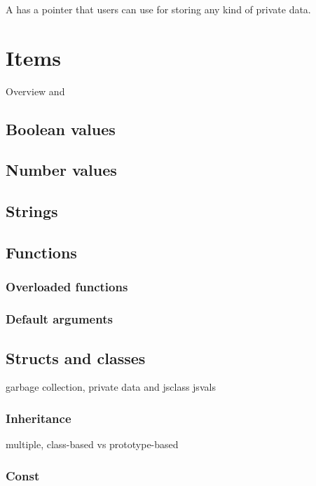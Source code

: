A  has a  pointer that  users can use for storing any kind of private data. 


\section{Items}

Overview  and 

\subsection{Boolean values}

\subsection{Number values}

\subsection{Strings}

\subsection{Functions}

\subsubsection{Overloaded functions}

\subsubsection{Default arguments}

\subsection{Structs and classes}

garbage collection, private data and jsclass jsvals

\subsubsection{Inheritance}

multiple, class-based vs prototype-based

\subsubsection{Const}

